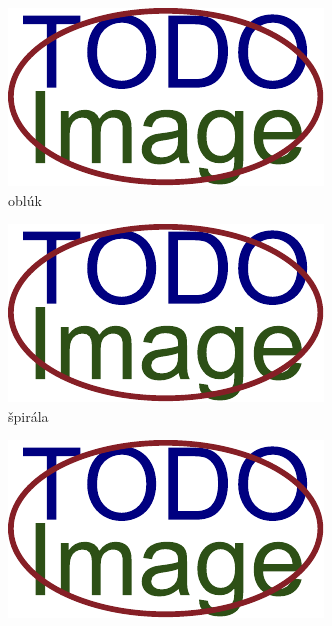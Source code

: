   \begin{figure}[h]\centering
    \centering
    \begin{subfigure}[b]{0.32\linewidth}
      \includegraphics[width=\linewidth]{obrazky-figures/placeholder.pdf}
      \caption{oblúk}
      \label{obr:triedy_odtlackov/obluk}
    \end{subfigure}
    \hfill
    \begin{subfigure}[b]{0.32\linewidth}
      \includegraphics[width=\linewidth]{obrazky-figures/placeholder.pdf}
      \caption{špirála}
      \label{obr:triedy_odtlackov/spirala}
    \end{subfigure}
    \hfill
    \begin{subfigure}[b]{0.32\linewidth}
      \includegraphics[width=\linewidth]{obrazky-figures/placeholder.pdf}

\end{subfigure}
\end{figure}
